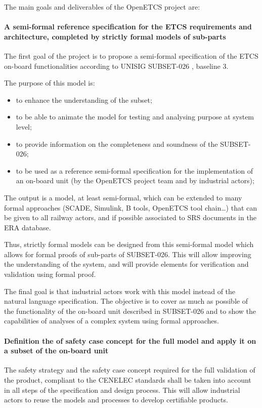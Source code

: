 \documentclass{template/openetcs_article}
\begin{document}
The main goals and deliverables of the OpenETCS project are:

\paragraph{A semi-formal reference specification for the ETCS requirements and architecture, completed by strictly formal models of sub-parts}
The first goal of the project is to propose a semi-formal specification of the ETCS on-board functionalities according to UNISIG SUBSET-026 \citep{subset026}, baseline 3.

The purpose of this model is:
\begin{itemize}
\item to enhance the understanding of the subset;
\item to be able to animate the model for testing and analysing purpose at system level;
\item to provide information on the completeness and soundness of the SUBSET-026;
\item to be used as a reference semi-formal specification for the implementation of an on-board unit
(by the OpenETCS project team and by industrial actors);
\end{itemize}

The output is a model, at least semi-formal, which can be extended to many formal approaches (SCADE,
Simulink, B tools, OpenETCS tool chain…) that can be given to all railway actors, and
if possible associated to SRS documents in the ERA database.

Thus, strictly formal models can be designed from this semi-formal model which allows for formal proofs of sub-parts of SUBSET-026. This will allow improving the understanding of the system, and will provide elements for verification and validation using formal proof.

The final goal is that industrial actors work with this model instead of the
natural language specification.
The objective is to cover as much as possible of the functionality of the on-board unit described in SUBSET-026 and to show the capabilities of analyses of a complex system using formal approaches.


\paragraph{Definition the of safety case concept for the full model and apply it on a subset of the on-board unit}
The safety strategy and the safety case concept required for the full validation of the product, compliant to the CENELEC standards shall be taken into account in all steps of the specification and design process. This will allow industrial actors to reuse the models and processes to develop certifiable products.
\end{document}
